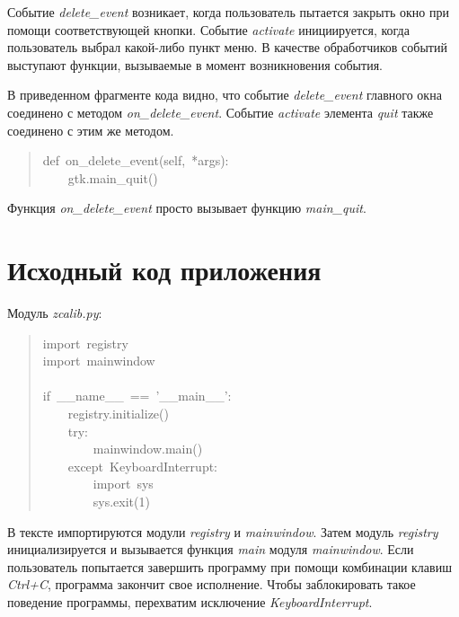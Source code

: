 \documentclass[a4paper,openany,twoside,final]{book}
\providecommand*{\DUroletitlereference}[1]{\textsl{#1}}
\begin{document}
Событие \DUroletitlereference{delete\_event} возникает, когда пользователь пытается закрыть
окно при помощи соответствующей кнопки.  Событие \DUroletitlereference{activate}
инициируется, когда пользователь выбрал какой-либо пункт меню.  В
качестве обработчиков событий выступают функции, вызываемые в момент
возникновения события.

В приведенном фрагменте кода видно, что событие \DUroletitlereference{delete\_event}
главного окна соединено с методом \DUroletitlereference{on\_delete\_event}.  Событие
\DUroletitlereference{activate} элемента \DUroletitlereference{quit} также соединено с этим же методом.

\begin{quote}{\ttfamily \raggedright \noindent
def~on\_delete\_event(self,~*args):\\
~~~~gtk.main\_quit()
}
\end{quote}

Функция \DUroletitlereference{on\_delete\_event} просто вызывает функцию \DUroletitlereference{main\_quit}.


\section{Исходный код приложения%
  \label{id52}%
}

Модуль \DUroletitlereference{zcalib.py}:

\begin{quote}{\ttfamily \raggedright \noindent
import~registry\\
import~mainwindow\\
~\\
if~\_\_name\_\_~==~'\_\_main\_\_':\\
~~~~registry.initialize()\\
~~~~try:\\
~~~~~~~~mainwindow.main()\\
~~~~except~KeyboardInterrupt:\\
~~~~~~~~import~sys\\
~~~~~~~~sys.exit(1)
}
\end{quote}

В тексте импортируются модули \DUroletitlereference{registry} и \DUroletitlereference{mainwindow}.  Затем модуль
\DUroletitlereference{registry} инициализируется и вызывается функция \DUroletitlereference{main} модуля
\DUroletitlereference{mainwindow}.  Если пользователь попытается завершить программу при
помощи комбинации клавиш \DUroletitlereference{Ctrl+C}, программа закончит свое исполнение.
Чтобы заблокировать такое поведение программы, перехватим исключение
\DUroletitlereference{KeyboardInterrupt}.
\end{document}
